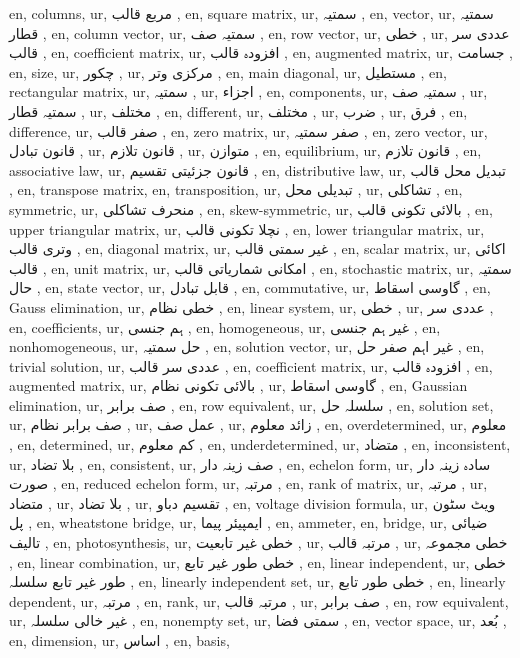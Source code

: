 en, columns,
ur, مربع قالب ,
en, square matrix,
ur, سمتیہ ,
en, vector,
ur, سمتیہ قطار ,
en, column vector,
ur, سمتیہ صف ,
en, row vector,
ur, خطی ,
ur, عددی سر قالب ,
en, coefficient matrix,
ur, افزودہ قالب ,
en, augmented matrix,
ur, جسامت ,
en, size,
ur, چکور ,
ur, مرکزی وتر ,
en, main diagonal,
ur, مستطیل ,
en, rectangular matrix,
ur, سمتیہ ,
ur, اجزاء ,
en, components,
ur, سمتیہ صف ,
ur, سمتیہ قطار ,
ur, مختلف ,
en, different,
ur, مختلف ,
ur, ضرب ,
ur, فرق ,
en, difference,
ur, صفر قالب ,
en, zero matrix,
ur, صفر سمتیہ ,
en, zero vector,
ur, قانون تبادل ,
ur, قانون تلازم ,
ur, متوازن ,
en, equilibrium,
ur, قانون تلازم ,
en, associative law,
ur, قانون جزئیتی تقسیم ,
en, distributive law,
ur, تبدیل محل قالب ,
en, transpose matrix,
en, transposition,
ur, تبدیلی محل ,
ur, تشاکلی ,
en, symmetric,
ur, منحرف تشاکلی ,
en, skew-symmetric,
ur, بالائی تکونی قالب ,
en, upper triangular matrix,
ur, نچلا تکونی قالب ,
en, lower triangular matrix,
ur, وتری قالب ,
en, diagonal matrix,
ur, غیر سمتی قالب ,
en, scalar matrix,
ur, اکائی قالب ,
en, unit matrix,
ur, امکانی شماریاتی قالب ,
en, stochastic matrix,
ur, سمتیہ حال ,
en, state vector,
ur, قابل تبادل ,
en, commutative,
ur, گاوسی اسقاط ,
en, Gauss elimination,
ur, خطی نظام ,
en, linear system,
ur, خطی ,
ur, عددی سر ,
en, coefficients,
ur, ہم جنسی ,
en, homogeneous,
ur, غیر ہم جنسی ,
en, nonhomogeneous,
ur, حل سمتیہ ,
en, solution vector,
ur, غیر اہم صفر حل ,
en, trivial solution,
ur, عددی سر قالب ,
en, coefficient matrix,
ur, افزودہ قالب ,
en, augmented matrix,
ur, بالائی تکونی نظام ,
ur, گاوسی اسقاط ,
en, Gaussian elimination,
ur, صف برابر ,
en, row equivalent,
ur, سلسلہ حل ,
en, solution set,
ur, صف برابر نظام ,
ur, عمل صف ,
ur, زائد معلوم ,
en, overdetermined,
ur, معلوم ,
en, determined,
ur, کم معلوم ,
en, underdetermined,
ur, متضاد ,
en, inconsistent,
ur, بلا تضاد ,
en, consistent,
ur, صف زینہ دار ,
en, echelon form,
ur, سادہ زینہ دار صورت ,
en, reduced echelon form,
ur, مرتبہ ,
en, rank of matrix,
ur, مرتبہ ,
ur, متضاد ,
ur, بلا تضاد ,
ur, تقسیم دباو ,
en, voltage division formula,
ur, ویٹ سٹون پل ,
en, wheatstone bridge,
ur, ایمپیئر پیما ,
en, ammeter,
en, bridge,
ur, ضیائی تالیف ,
en, photosynthesis,
ur, خطی غیر تابعیت ,
ur, مرتبہ قالب ,
ur, خطی مجموعہ ,
en, linear combination,
ur, خطی طور غیر تابع ,
en, linear independent,
ur, خطی طور غیر تابع سلسلہ ,
en, linearly independent set,
ur, خطی طور تابع ,
en, linearly dependent,
ur, مرتبہ ,
en, rank,
ur, مرتبہ قالب ,
ur, صف برابر ,
en, row equivalent,
ur, غیر خالی سلسلہ ,
en, nonempty set,
ur, سمتی فضا ,
en, vector space,
ur, بُعد ,
en, dimension,
ur, اساس ,
en, basis,
